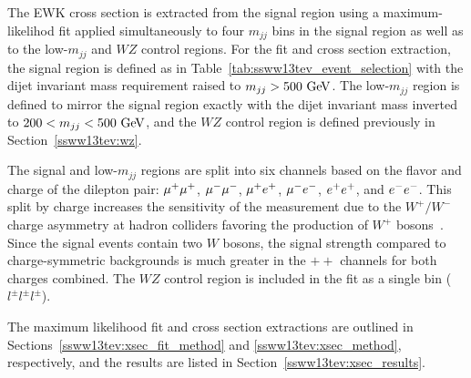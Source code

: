 
The \ssww EWK cross section is extracted from the signal region using a maximum-likelihod fit applied simultaneously to four $m_{jj}$ bins in the signal region as well as to the low-$m_{jj}$ and $WZ$ control regions.
For the fit and cross section extraction, the signal region is defined as in Table~\ref{tab:ssww13tev_event_selection} with the dijet invariant mass requirement raised to $m_{jj} > 500\gev$.
The low-$m_{jj}$ region is defined to mirror the signal region exactly with the dijet invariant mass inverted to $200 < m_{jj} < 500\gev$, and the $WZ$ control region is defined previously in Section~\ref{ssww13tev:wz}.

The signal and low-$m_{jj}$ regions are split into six channels based on the flavor and charge of the dilepton pair: $\mu^{+}\mu^{+}$, $\mu^{-}\mu^{-}$, $\mu^{+}e^{+}$, $\mu^{-}e^{-}$, $e^{+}e^{+}$, and $e^{-}e^{-}$.
This split by charge increases the sensitivity of the measurement due to the $W^{+}/W^{-}$ charge asymmetry at hadron colliders favoring the production of $W^{+}$ bosons~\cite{2010.w-charge-asymmetry}.
Since the signal events contain two $W$ bosons, the signal strength compared to charge-symmetric backgrounds is much greater in the $++$ channels for both charges combined.
The $WZ$ control region is included in the fit as a single bin ($l^{\pm}l^{\pm}l^{\pm}$).

The maximum likelihood fit and cross section extractions are outlined in Sections~\ref{ssww13tev:xsec_fit_method} and \ref{ssww13tev:xsec_method}, respectively, and the results are listed in Section~\ref{ssww13tev:xsec_results}.

